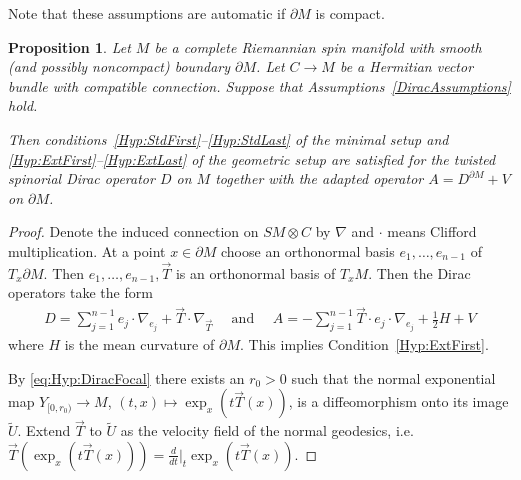 \documentclass[a4paper,10pt,reqno]{amsart}
\newcommand{\dM}{\partial M}
\newtheorem{proposition}[theorem]{Proposition}
\theoremstyle{definition}
\begin{document}
Note that these assumptions are automatic if $\dM$ is compact.

\begin{proposition}\label{prop:Dirac}
Let $M$ be a complete Riemannian spin manifold with smooth (and possibly noncompact) boundary $\dM$.
Let $C\to M$ be a Hermitian vector bundle with compatible connection.
Suppose that Assumptions~\ref{DiracAssumptions} hold.

Then conditions~\ref{Hyp:StdFirst}--\ref{Hyp:StdLast} of the minimal setup and \ref{Hyp:ExtFirst}--\ref{Hyp:ExtLast} of the geometric setup are satisfied for the twisted spinorial Dirac operator $D$ on $M$ together with the adapted operator $A=D^{\dM}+V$ on $\dM$.
\end{proposition}

\begin{proof}
Denote the induced connection on $SM\otimes C$ by $\nabla$ and $\cdot$ means Clifford multiplication.
At a point $x\in\dM$ choose an orthonormal basis $e_1,\dots,e_{n-1}$ of $T_x\dM$.
Then $e_1,\dots,e_{n-1},\vec{T}$ is an orthonormal basis of $T_x M$.
Then the Dirac operators take the form
\begin{align*}
D = \sum_{j=1}^{n-1}e_j\cdot \nabla_{e_j} + \vec{T}\cdot \nabla_{\vec{T}}
\quad\text{ and }\quad
A = -\sum_{j=1}^{n-1}\vec{T}\cdot e_j\cdot \nabla_{e_j} + \tfrac12 H + V
\end{align*}
where $H$ is the mean curvature of $\dM$.
This implies Condition~\ref{Hyp:ExtFirst}.

By \ref{eq:Hyp:DiracFocal} there exists an $r_0>0$ such that the normal exponential map $Y_{[0,r_0)}\to M$, $(t,x)\mapsto \exp_x(t\vec{T}(x))$, is a diffeomorphism onto its image $\tilde U$.
Extend $\vec{T}$ to $\tilde U$ as the velocity field of the normal geodesics, i.e.\ $\vec{T}(\exp_x(t\vec{T}(x))) = \frac{d}{dt}|_t\exp_x(t\vec{T}(x))$.


\end{proof}
\end{document}
